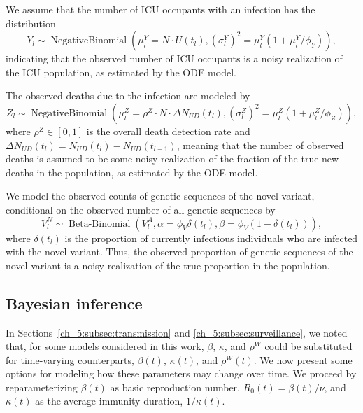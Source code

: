 We assume that the number of ICU occupants with an infection has the distribution
\begin{equation}
Y_l \sim \operatorname{Negative Binomial} \left( \mu^{Y}_l = N \cdot U \left( t_l \right), \left(\sigma^Y_l\right)^{2} = \mu^{Y}_l \left( 1 + \mu^{Y}_l / \phi_Y \right) \right),
\label{ch_5:eqn:icu_emission}
\end{equation}
indicating that the observed number of ICU occupants is a noisy realization of the ICU population, as estimated by the ODE model.

The observed deaths due to the infection are modeled by
\begin{equation}
Z_l \sim \operatorname{Negative Binomial} \left( \mu^{Z}_l = \rho^Z \cdot N \cdot \Delta N_{UD} \left( t_l \right), \left(\sigma^Z_l\right)^{2} = \mu^{Z}_l \left( 1 + \mu^{Z}_l / \phi_Z \right) \right),
\label{ch_5:eqn:death_emission}
\end{equation}
where \( \rho^Z \in [0,1]\) is the overall death detection rate and \( \Delta N_{UD}(t_l) = N_{UD}(t_l) - N_{UD}(t_{l-1}) \), meaning that the number of observed deaths is assumed to be some noisy realization of the fraction of the true new deaths in the population, as estimated by the ODE model.

We model the observed counts of genetic sequences of the novel variant, conditional on the observed number of all genetic sequences by
\begin{equation}
V^N_l \sim \operatorname{Beta-Binomial} \left( V^A_l, \alpha = \phi_V \delta \left( t_l \right), \beta = \phi_V \left( 1 -  \delta \left( t_l \right) \right) \right),
\label{ch_5:eqn:novel_variant_emission}
\end{equation}
where \( \delta \left( t_l \right) \) is the proportion of currently infectious individuals who are infected with the novel variant.
Thus, the observed proportion of genetic sequences of the novel variant is a noisy realization of the true proportion in the population.

\subsection{Bayesian inference}
\label{ch_5:subsec:bayesian}

In Sections~\ref{ch_5:subsec:transmission} and \ref{ch_5:subsec:surveillance}, we noted that, for some models considered in this work, \( \beta \), \( \kappa \), and \( \rho^W \) could be substituted for time-varying counterparts, \( \beta(t) \), \( \kappa(t) \), and \( \rho^W(t) \).
We now present some options for modeling how these parameters may change over time.
We proceed by reparameterizing \( \beta(t) \) as  basic reproduction number, \( R_0(t) = \beta(t) / \nu \), and \( \kappa(t) \) as the average immunity duration, \( 1 / \kappa(t) \).

